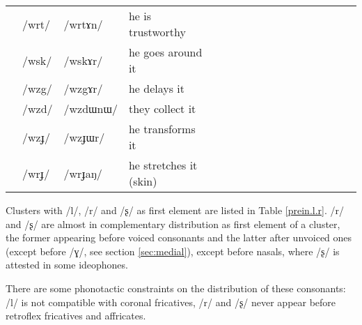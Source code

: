 \documentclass[oldfontcommands,oneside,a4paper,11pt]{article}
\newcommand{\ipa}[1]{{\phon/#1/}} %
\newcommand{\trois}[1]{/#1/}
\newcommand{\tib}[1]{\cellcolor{lightgray}\textbf{#1}}
\begin{document}
\begin{table}
{\begin{tabular}{l|lll|lll|lll|lllllll}
&	\trois{wrt}  \tib{} &	\ipa{wrtɤn}  &	he is trustworthy\\
&	\trois{wsk}  \tib{} &	\ipa{wskɤr}  & he goes around it	\\
&	\trois{wzg}  \tib{} &	\ipa{wzgɤr}  & he delays it	\\
&	\trois{wzd}  \tib{} &	\ipa{wzdɯnɯ}  & they collect it	\\
&	\trois{wzɟ}  \tib{} &	\ipa{wzɟɯr}  & he transforms it	\\
&	\trois{wrɟ}  \tib{} &	\ipa{wrɟaŋ}  &he stretches it (skin)	\\
\bottomrule
\end{tabular}} 
\end{table}
 
 Clusters with /l/, /r/  and /ʂ/ as first element are listed in Table \ref{prein.l.r}. /r/ and /ʂ/ are almost in complementary distribution as first element of a cluster, the former appearing before voiced consonants and the latter after unvoiced ones (except before /ɣ/, see section \ref{sec:medial}), except before nasals, where /ʂ/ is attested in some ideophones.
 
 There are some phonotactic constraints on the distribution of these consonants: /l/ is not compatible with coronal fricatives, /r/ and /ʂ/ never appear before retroflex fricatives and affricates.  
 
\end{document}
